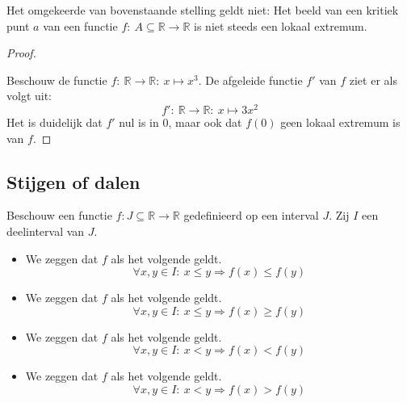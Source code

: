 \documentclass[main.tex]{subfiles}
\begin{document}
\begin{tvb}
  Het omgekeerde van bovenstaande stelling geldt niet:
  Het beeld van een kritiek punt $a$ van een functie $f:\ A \subseteq \mathbb{R} \rightarrow \mathbb{R}$ is niet steeds een lokaal extremum.

  \begin{proof}
    \begin{figure}[H]
      \centering
    \end{figure}
    Beschouw de functie $f:\ \mathbb{R} \rightarrow \mathbb{R}:\ x \mapsto x^{3}$.
    De afgeleide functie $f'$ van $f$ ziet er als volgt uit:
    \[ f':\ \mathbb{R} \rightarrow \mathbb{R}:\ x \mapsto 3x^{2} \]
    Het is duidelijk dat $f'$ nul is in $0$, maar ook dat $f(0)$ geen lokaal extremum is van $f$.
  \end{proof}
\end{tvb}


\subsection{Stijgen of dalen}
\label{sec:stijgen-dalen}

\begin{de}
  Beschouw een functie $f: J \subseteq \mathbb{R} \rightarrow \mathbb{R}$ gedefinieerd op een interval $J$.
  Zij $I$ een deelinterval van $J$.
  \begin{itemize}
  \item We zeggen dat $f$  als het volgende geldt.
    \[ \forall x,y \in I:\ x \le y \Rightarrow f(x) \le f(y) \]
  \item We zeggen dat $f$  als het volgende geldt.
    \[ \forall x,y \in I:\ x \le y \Rightarrow f(x) \ge f(y) \]
  \item We zeggen dat $f$  als het volgende geldt.
    \[ \forall x,y \in I:\ x < y \Rightarrow f(x) < f(y) \]
  \item We zeggen dat $f$  als het volgende geldt.
    \[ \forall x,y \in I:\ x < y \Rightarrow f(x) > f(y) \]
  \end{itemize}
\end{de}
\end{document}

